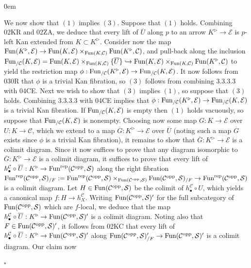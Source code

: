 \documentclass[10pt]{article}
\newcommand{\mS}{\mathcal S}
\newcommand{\C}{\mathcal C}
\newcommand{\cE}{\mathcal{E}}
\renewcommand{\qed}{\hfill$\square$}
\renewenvironment{proof}{\begin{addmargin}[1em]{0em}\begin{newproof}}{\end{newproof}\end{addmargin}\qed}
\theoremstyle{witharg}
\theoremstyle{witharg}
\theoremstyle{witharg2}
\begin{document}
\begin{proof}
    We now show that $(1)$ implies $(3)$. Suppose that $(1)$ holds. Combining  02KR and  02ZA, we deduce that every lift of $\overline{U}$ along $p$ to an arrow $K^\triangleright\rightarrow \cE$ is $p$-left Kan extended from $K\subset K^\triangleright$. Consider now the map $\textnormal{Fun}(K^\triangleright,\cE)\rightarrow \textnormal{Fun}(K,\cE)\times_{\textnormal{Fun}(K,\C)}\textnormal{Fun}(K^\triangleright,\C)$, and pull-back along the inclusion $\textnormal{Fun}_{/\C}(K,\cE)=\textnormal{Fun}(K,\cE)\times_{\textnormal{Fun}(K,\C)}\{\overline{U}\}\hookrightarrow \textnormal{Fun}(K,\cE)\times_{\textnormal{Fun}(K,\C)}\textnormal{Fun}(K^\triangleright,\C)$ to yield the restriction map $\phi:\textnormal{Fun}_{/\C}(K^\triangleright,\cE)\rightarrow \textnormal{Fun}_{/\C}(K,\cE)$. It now follows from   030R that $\phi$ is a trivial Kan fibration, so $(3)$ follows from combining  3.3.3.3 with  04CE. Next we wish to show that $(3)$ implies $(1)$, so suppose that $(3)$ holds. Combining  3.3.3.3 with  04CE implies that $\phi:\textnormal{Fun}_{/\C}(K^\triangleright,\cE)\rightarrow \textnormal{Fun}_{/\C}(K,\cE)$ is a trivial Kan fibration. If $\textnormal{Fun}_{/\C}(K,\cE)$ is empty then $(1)$ holds vacuously, so suppose that $\textnormal{Fun}_{/\C}(K,\cE)$ is nonempty. Choosing now some map $G:K\rightarrow \cE$ over $U:K \rightarrow \C$, which we extend to a map $\overline{G}:K^\triangleright\rightarrow \cE$ over $\overline{U}$ (noting such a map $\overline{G}$ exists since $\phi$ is a trivial Kan fibration), it remains to show that $\overline{G}:K^\triangleright\rightarrow \cE$ is a colimit diagram. Since it now suffices to prove that any diagram isomorphic to $\overline{G}:K^\triangleright\rightarrow \cE$ is a colimit diagram, it suffices to prove that every lift of $h^\C_\bullet\circ \overline{U}:K^\triangleright \rightarrow \textnormal{Fun}^{\textnormal{rep}}(\C^{\textnormal{opp}},\mS)$ along the right fibration $\textnormal{Fun}^{\textnormal{rep}}(\C^{\textnormal{opp}},\mS)_{/F}:=\textnormal{Fun}^{\textnormal{rep}}(\C^{\textnormal{opp}},\mS)\times_{\textnormal{Fun}(\C^{\textnormal{opp}},\mS)}\textnormal{Fun}(\C^{\textnormal{opp}},\mS)_{/F}\rightarrow \textnormal{Fun}^{\textnormal{rep}}(\C^{\textnormal{opp}},\mS)$ is a colimit diagram. Let $H\in \textnormal{Fun}(\C^{\textnormal{opp}},\mS)$ be the colimit of $h^\C_\bullet\circ U$, which yields a canonical map $f:H\rightarrow h^\C_X$. Writing $\textnormal{Fun}(\C^{\textnormal{opp}},\mS)^\prime$ for the full subcategory of $\textnormal{Fun}(\C^{\textnormal{opp}},\mS)$ which are $f$-local, we deduce that the map $h^\C_\bullet\circ \overline{U}:K^\triangleright\rightarrow \textnormal{Fun}(\C^{\textnormal{opp}},\mS)^\prime$ is a colimit diagram. Noting also that $F\in \textnormal{Fun}(\C^{\textnormal{opp}},\mS)^\prime$, it follows from  02KC that every lift of $h^\C_\bullet\circ \overline{U}:K^\triangleright\rightarrow \textnormal{Fun}(\C^{\textnormal{opp}},\mS)^\prime$ along $\textnormal{Fun}(\C^{\textnormal{opp}},\mS)^\prime_{/F}\rightarrow \textnormal{Fun}(\C^{\textnormal{opp}},\mS)^\prime$ is a colimit diagram. Our claim now 
\end{proof}
\end{document}
